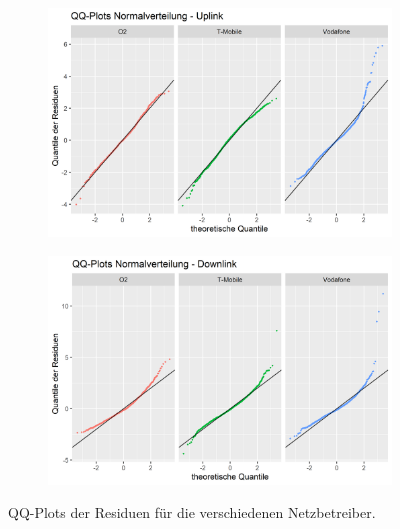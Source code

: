 \begin{figure}
\centering
\begin{subfigure}{\textwidth}
    \centering
    \includegraphics[width=\textwidth]{abbildungen/qq_plots_ul}
\end{subfigure}
\begin{subfigure}{\textwidth}
    \centering
    \includegraphics[width=\textwidth]{abbildungen/qq_plots_dl}
\end{subfigure}
\caption{QQ-Plots der Residuen f\"ur die verschiedenen Netzbetreiber.}
\label{fig:qq-plots}
\end{figure}
